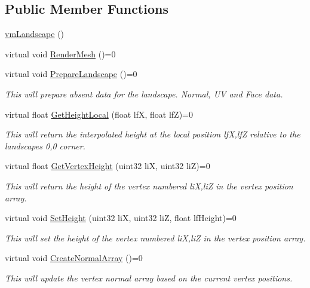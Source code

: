 \subsection*{Public Member Functions}
\begin{DoxyCompactItemize}
\item 
\hyperlink{classvm_landscape_ad475f2d00f6176ada00ecf72e316b7bb}{vmLandscape} ()
\item 
virtual void \hyperlink{classvm_landscape_af70bb0aba4fdd58797afce3719aaf2f6}{RenderMesh} ()=0
\item 
virtual void \hyperlink{classvm_landscape_a48ea00e21cdaa26c37ee3135d8e24367}{PrepareLandscape} ()=0
\begin{DoxyCompactList}\small\item\em This will prepare absent data for the landscape. Normal, UV and Face data. \item\end{DoxyCompactList}\item 
virtual float \hyperlink{classvm_landscape_ae9448517f100dd79bd7114f7472ff9bd}{GetHeightLocal} (float lfX, float lfZ)=0
\begin{DoxyCompactList}\small\item\em This will return the interpolated height at the local position lfX,lfZ relative to the landscapes 0,0 corner. \item\end{DoxyCompactList}\item 
virtual float \hyperlink{classvm_landscape_a9a2091d27b1b121d72861fa4c1413e9e}{GetVertexHeight} (uint32 liX, uint32 liZ)=0
\begin{DoxyCompactList}\small\item\em This will return the height of the vertex numbered liX,liZ in the vertex position array. \item\end{DoxyCompactList}\item 
virtual void \hyperlink{classvm_landscape_a7547b9cdbdeb2e8e3bb9e15d274d447e}{SetHeight} (uint32 liX, uint32 liZ, float lfHeight)=0
\begin{DoxyCompactList}\small\item\em This will set the height of the vertex numbered liX,liZ in the vertex position array. \item\end{DoxyCompactList}\item 
virtual void \hyperlink{classvm_landscape_a5417f258c6001a9a925748abf78dbf1d}{CreateNormalArray} ()=0
\begin{DoxyCompactList}\small\item\em This will update the vertex normal array based on the current vertex positions. \item\end{DoxyCompactList}\item 

\end{DoxyCompactItemize}
